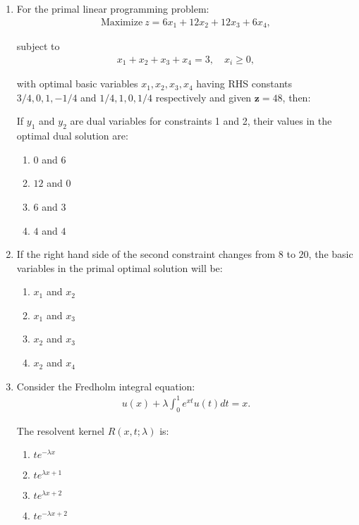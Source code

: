 \documentclass[journal]{IEEEtran}
\numberwithin{equation}{enumi}
\numberwithin{figure}{enumi}
\begin{document}
\begin{enumerate}
\item
For the primal linear programming problem:
\begin{align}
    \text{Maximize}\ z = 6x_1 + 12x_2 + 12x_3 + 6x_4,
\end{align}

subject to
\begin{align}
    x_1 + x_2 + x_3 + x_4 = 3, \quad x_i \geq 0,
\end{align}

with optimal basic variables $x_1, x_2, x_3, x_4$ having RHS constants $3/4, 0, 1, -1/4$ and $1/4, 1, 0, 1/4$ respectively and given $\boldsymbol{z} = 48$, then:

If $y_1$ and $y_2$ are dual variables for constraints 1 and 2, their values in the optimal dual solution are:
\hfill{}
\begin{multicols}{2}
\begin{enumerate}
\item $0$ and $6$
\item $12$ and $0$
\item $6$ and $3$
\item $4$ and $4$
\end{enumerate}
\end{multicols}

\item
If the right hand side of the second constraint changes from $8$ to $20$, the basic variables in the primal optimal solution will be:
\hfill{}
\begin{multicols}{2}
\begin{enumerate}
\item $x_1$ and $x_2$
\item $x_1$ and $x_3$
\item $x_2$ and $x_3$
\item $x_2$ and $x_4$
\end{enumerate}
\end{multicols}

\item
Consider the Fredholm integral equation:
\begin{align}
    u(x) + \lambda \int_0^1 e^{x t} u(t) dt = x.
\end{align}

The resolvent kernel $R(x,t;\lambda)$ is:
\hfill{}
\begin{multicols}{4}
\begin{enumerate}
\item $t e^{-\lambda x}$
\item $t e^{\lambda x + 1}$
\item $t e^{\lambda x + 2}$
\item $t e^{-\lambda x + 2}$
\end{enumerate}
\end{multicols}


\end{enumerate}
\end{document}
